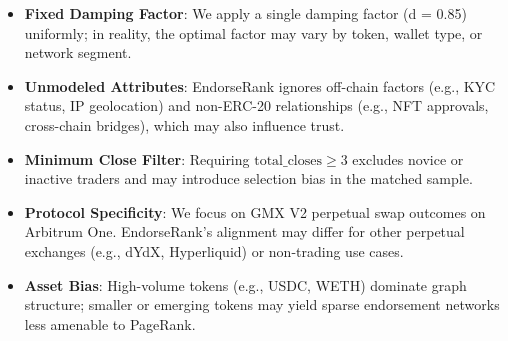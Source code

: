 \begin{itemize}
\item[\textbullet] \textbf{Fixed Damping Factor}: We apply a single damping factor (d = 0.85) uniformly; in reality, the optimal factor may vary by token, wallet type, or network segment.
\item[\textbullet] \textbf{Unmodeled Attributes}: EndorseRank ignores off-chain factors (e.g., KYC status, IP geolocation) and non-ERC-20 relationships (e.g., NFT approvals, cross-chain bridges), which may also influence trust.
\item[\textbullet] \textbf{Minimum Close Filter}: Requiring $\text{total\_closes} \geq 3$ excludes novice or inactive traders and may introduce selection bias in the matched sample.
\end{itemize}

\begin{itemize}
\item[\textbullet] \textbf{Protocol Specificity}: We focus on GMX V2 perpetual swap outcomes on Arbitrum One. EndorseRank's alignment may differ for other perpetual exchanges (e.g., dYdX, Hyperliquid) or non-trading use cases.
\item[\textbullet] \textbf{Asset Bias}: High-volume tokens (e.g., USDC, WETH) dominate graph structure; smaller or emerging tokens may yield sparse endorsement networks less amenable to PageRank.
\end{itemize}

